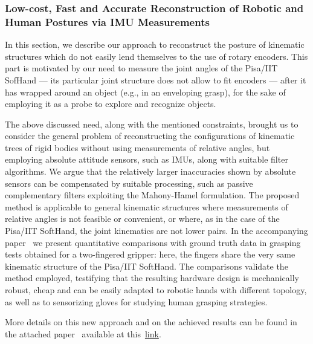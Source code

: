 
\subsubsection{Low-cost, Fast and Accurate Reconstruction of Robotic and Human Postures via IMU Measurements} 

In this section, we describe our approach to reconstruct the posture of kinematic structures which do not easily lend themselves to the use of rotary encoders. This part is motivated by our need to measure the joint angles of the Pisa/IIT SofHand --- its particular joint structure does not allow to fit encoders ---  after it has wrapped around an object (e.g., in an enveloping grasp), for the sake of employing it as a probe to explore and recognize objects.
 
The above discussed need, along with the mentioned constraints, brought us to consider the general problem of reconstructing the configurations of kinematic trees of rigid bodies without using measurements of relative angles, but employing absolute attitude sensors, such as IMUs, along with suitable filter algorithms. We argue that the relatively larger inaccuracies shown by absolute sensors can be compensated by suitable processing, such as passive complementary filters exploiting the Mahony-Hamel formulation. The proposed method is applicable to general kinematic structures where measurements of relative angles is not feasible or convenient, or where, as in the case of the Pisa/IIT SoftHand, the joint kinematics are not lower pairs. In the accompanying paper~\cite{Santaera:ICRA:2015} we present quantitative comparisons with ground truth data in grasping tests obtained for a two-fingered gripper: here, the fingers share the very same kinematic structure of the Pisa/IIT SoftHand. The comparisons validate the method employed, testifying that the resulting hardware design is mechanically robust, cheap and can be easily adapted to robotic hands with different topology, as well as to sensorizing gloves for studying human grasping strategies.

More details on this new approach and on the achieved results can be found in the attached paper~\cite{Santaera:ICRA:2015} available at this~\href{./attachedPapers/ReconstructionPosturesImuMeasurements.pdf}{link}.  